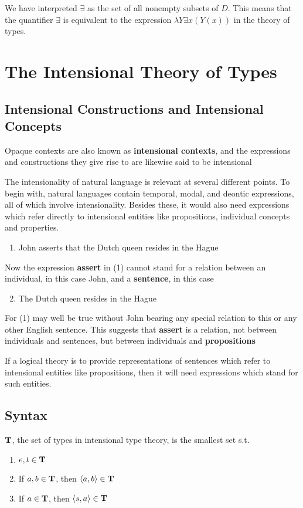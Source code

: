 \documentclass[11pt]{article}
\begin{document}
We have interpreted \(\exists\) as the set of all nonempty subsets of \(D\).
This means that the quantifier \(\exists\) is equivalent to the expression
\(\lambda Y\exists x(Y(x))\) in the theory of types.
\section{The Intensional Theory of Types}
\label{sec:org82111f2}
\subsection{Intensional Constructions and Intensional Concepts}
\label{sec:orgd778aa1}
Opaque contexts are also known as \textbf{intensional contexts}, and the expressions
and constructions they give rise to are likewise said to be intensional 

The intensionality of natural language is relevant at several different
points. To begin with, natural languages contain temporal, modal, and deontic
expressions, all of which involve intensionality. Besides these, it would
also need expressions which refer directly to intensional entities like
propositions, individual concepts and properties.
\begin{enumerate}
\item John asserts that the Dutch queen resides in the Hague
\end{enumerate}


Now the expression \textbf{assert} in (1) cannot stand for a relation between an
individual, in this case John, and a \textbf{sentence}, in this case
\begin{enumerate}
\setcounter{enumi}{1}
\item The Dutch queen resides in the Hague
\end{enumerate}


For (1) may well be true without John bearing any special relation to this or
any other English sentence. This suggests that \textbf{assert} is a relation, not
between individuals and sentences, but between individuals and \textbf{propositions}

If a logical theory is to provide representations of sentences which refer to
intensional entities like propositions, then it will need expressions which
stand for such entities.
\subsection{Syntax}
\label{sec:org26b40eb}
\begin{definition}[]
\(\operatorname{\textbf{T}}\), the set of types in intensional type theory, is the smallest set
s.t.
\begin{enumerate}
\item \(e,t\in\operatorname{\textbf{T}}\)
\item If \(a,b\in\operatorname{\textbf{T}}\), then \(\langle a,b\rangle\in\operatorname{\textbf{T}}\)
\item If \(a\in\operatorname{\textbf{T}}\), then \(\langle s,a\rangle\in\operatorname{\textbf{T}}\)
\end{enumerate}
\end{definition}
\end{document}
